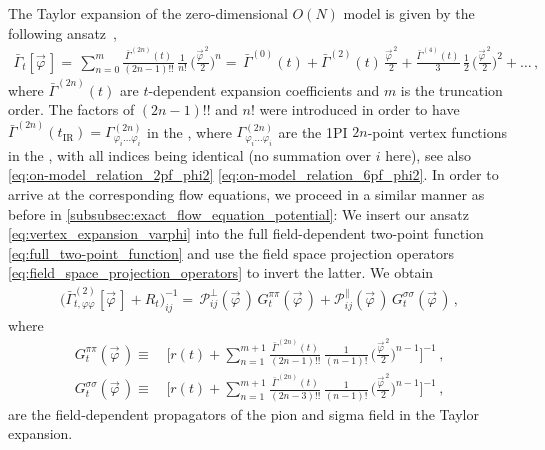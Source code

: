 The \frg{} Taylor expansion of the zero-dimensional $O(N)$ model is given by the following ansatz~\cite{Keitel:2011pn,Moroz:2011thesis,Pawlowski:talk,Kemler:2013yka},
\begin{align}
	\bar{\Gamma}_t [ \vec{\varphi} \, ] =\, \sum_{n = 0}^{m} \frac{\bar{\Gamma}^{(2n)}(t)}{(2n - 1)!!}\, \frac{1}{n!}\, \bigg( \frac{\vec{\varphi}^{\, 2}}{2} \bigg)^n 
	=\, \bar{\Gamma}^{(0)}(t) + \bar{\Gamma}^{(2)}(t)\,  \frac{\vec{\varphi}^{\, 2}}{2} + \frac{\bar{\Gamma}^{(4)}(t)}{3}\, \frac{1}{2}\, \bigg( \frac{\vec{\varphi}^{\, 2}}{2} \bigg)^2 + \ldots \, ,	\label{eq:vertex_expansion_varphi}
\end{align}
where $\bar{\Gamma}^{(2n)}(t)$ are $t$-dependent expansion coefficients and $m$ is the truncation order.
The factors of $(2n - 1)!!$ and $n!$ were introduced in order to have $\bar{\Gamma}^{(2n)}(t_\mathrm{IR}) = \Gamma^{(2n)}_{\varphi_i \ldots \varphi_i}$ in the \ir{}, where $\Gamma^{(2n)}_{\varphi_i \ldots \varphi_i}$ are the 1PI $2n$-point vertex functions in the \ir{}, with all indices being identical (no summation over $i$ here), see also \cref{eq:on-model_relation_2pf_phi2} \dash{} \eqref{eq:on-model_relation_6pf_phi2}.
In order to arrive at the corresponding flow equations, we proceed in a similar manner as before in \cref{subsubsec:exact_flow_equation_potential}:
We insert our ansatz \eqref{eq:vertex_expansion_varphi} into the full field-dependent two-point function \eqref{eq:full_two-point_function} and use the field space projection operators \eqref{eq:field_space_projection_operators} to invert the latter.
We obtain
\begin{align}
	\big( \bar{\Gamma}^{(2)}_{t,\varphi \varphi} [ \vec{\varphi} \, ] + R_t \big)^{-1}_{i j} =\, \mathcal{P}^\perp_{i j} ( \vec{\varphi} \, ) \, G^{\pi\pi}_t ( \vec{\varphi} \, ) + \mathcal{P}^\parallel_{i j} ( \vec{\varphi} \, ) \, G^{\sigma\sigma}_t ( \vec{\varphi} \, ) \, ,
\end{align}
where
\begin{subequations}
\begin{align}
	G^{\pi \pi}_t ( \vec{\varphi} \, ) \equiv\, & \Bigg[ r ( t ) + \sum_{n = 1}^{m+1} \frac{\bar{\Gamma}^{(2n)}(t)}{(2n - 1)!!}\, \frac{1}{(n - 1)!}\, \bigg( \frac{\vec{\varphi}^{\, 2}}{2} \bigg)^{n-1} \Bigg]^{-1} \, ,
	\\
	G^{\sigma \sigma}_t ( \vec{\varphi} \, ) \equiv\, & \Bigg[ r ( t ) + \sum_{n = 1}^{m+1} \frac{\bar{\Gamma}^{(2n)}(t)}{(2n - 3)!!}\, \frac{1}{(n - 1)!}\, \bigg( \frac{\vec{\varphi}^{\, 2}}{2} \bigg)^{n-1} \Bigg]^{-1} \, ,
\end{align}
\end{subequations}
are the field-dependent propagators of the pion and sigma field in the Taylor expansion.

